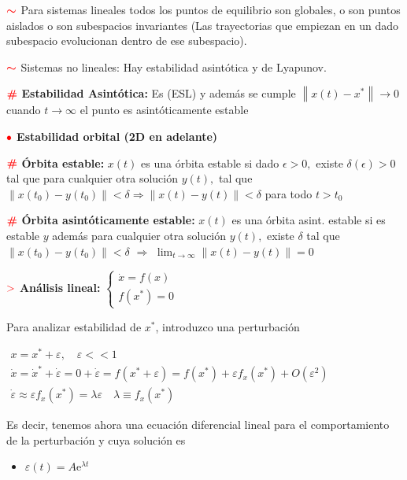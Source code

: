 \documentclass[%
 reprint,
 amsmath,amssymb,
 aps,
]{revtex4-1}
\newcommand{\propiedad}{\textcolor{red}{\mathbf{>}}}
\newcommand{\definir}{\color{red}{\textbf{\#}}}
\newcommand{\tema}{\color{red}{\bullet}}
\newcommand{\nota}{\textcolor{red}{\color{red}{\boldsymbol{\sim}}}}
\begin{document}
$\nota$ 
Para sistemas lineales todos los puntos de equilibrio son globales, o son puntos aislados o son subespacios invariantes (Las trayectorias que empiezan en un dado subespacio evolucionan dentro de ese subespacio).

$\nota$ 
Sistemas no lineales: Hay estabilidad asintótica y de Lyapunov.


$\definir$ \textbf{Estabilidad Asintótica:} 
Es (ESL) y además se cumple $\left\|x(t)-x^{*}\right\| \rightarrow 0$ cuando $t \rightarrow \infty$ el punto es asintóticamente estable

$\tema$ \textbf{Estabilidad orbital (2D en adelante)}

$\definir$ \textbf{Órbita estable:} 
$x(t)$ es una órbita estable si dado $\epsilon>0,$ existe $\delta(\epsilon)>0$ tal que para cualquier otra solución $y(t),$ tal que $\| x\left(t_{0}\right)-y\left(t_{0}\right) \|<\delta \Rightarrow \| x(t)-y(t) \| < \delta$ para todo $t>t_{0}$

$\definir$ \textbf{Órbita asintóticamente estable:} 
$x(t)$ es una órbita asint. estable si es estable $y$ además para cualquier otra solución $y(t),$ existe $\delta$ tal que $\| x\left(t_{0}\right)-y\left(t_{0}\right) \|<\delta$ $\Rightarrow$ $\lim _{t \rightarrow \infty} \| x\left(t\right)-y\left(t\right) \| =0$

$\propiedad$ \textbf{Análisis lineal:}
$
\left\lbrace 
\begin{array}{l}
\dot{x}=f(x) \\
f\left(x^{*}\right)=0
\end{array}
\right.
$

Para analizar estabilidad de $x^{*}$, introduzco una perturbación

$
\begin{array}{c}
x = x^{*}+\varepsilon, \quad \varepsilon<<1 \\
\dot{x}=\dot{x}^{*}+\dot{\varepsilon}=0+\dot{\varepsilon}=f\left(x^{*}+\varepsilon\right)=f\left(x^{*}\right)+\varepsilon f_{x}\left(x^{*}\right)+O\left(\varepsilon^{2}\right) \\
\dot{\varepsilon} \approx \varepsilon f_{x}\left(x^{*}\right)=\lambda \varepsilon \quad \lambda \equiv f_{x}\left(x^{*}\right)
\end{array}
$

Es decir, tenemos ahora una ecuación diferencial lineal para el comportamiento de la perturbación y cuya solución es

\begin{itemize}\centering
  \item[]  $\varepsilon(t)=A \mathrm{e}^{\lambda t}$
\end{itemize}
\end{document}
